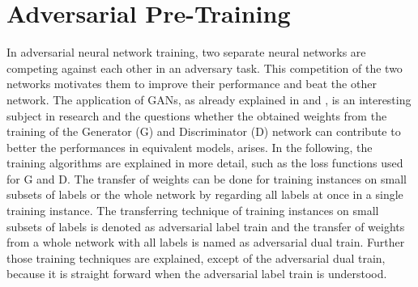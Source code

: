 
\section{Adversarial Pre-Training}\label{sec:nn_adv}
\thesisStateRevised
In adversarial neural network training, two separate neural networks are competing against each other in an adversary task.
This competition of the two networks motivates them to improve their performance and beat the other network.
The application of GANs, as already explained in  and , is an interesting subject in research and the questions whether the obtained weights from the training of the Generator (G) and Discriminator (D) network can contribute to better the performances in equivalent models, arises.
In the following, the training algorithms are explained in more detail, such as the loss functions used for G and D.
The transfer of weights can be done for training instances on small subsets of labels or the whole network by regarding all labels at once in a single training instance.
The transferring technique of training instances on small subsets of labels is denoted as adversarial label train and the transfer of weights from a whole network with all labels is named as adversarial dual train.
Further those training techniques are explained, except of the adversarial dual train, because it is straight forward when the adversarial label train is understood.



